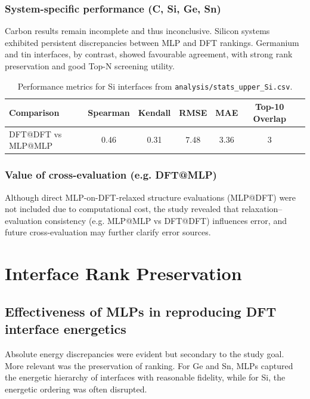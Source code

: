 \subsubsection{System-specific performance (C, Si, Ge, Sn)}

Carbon results remain incomplete and thus inconclusive. Silicon systems exhibited persistent discrepancies between MLP
and DFT rankings. Germanium and tin interfaces, by contrast, showed favourable agreement, with strong rank preservation
and good Top-N screening utility.

\begin{table}[h]
    \centering
    \caption{Performance metrics for Si interfaces from \texttt{analysis/stats_upper_Si.csv}.}
    \begin{tabular}{lcccccc}
        Comparison & Spearman & Kendall & RMSE & MAE & Top-10 Overlap \\
        \hline
        DFT@DFT vs MLP@MLP & 0.46 & 0.31 & 7.48 & 3.36 & 3 \\
    \end{tabular}
\end{table}

\subsubsection{Value of cross-evaluation (e.g. DFT@MLP)}

Although direct MLP-on-DFT-relaxed structure evaluations (MLP@DFT) were not included due to computational cost, the
study revealed that relaxation--evaluation consistency (e.g. MLP@MLP vs DFT@DFT) influences error, and future
cross-evaluation may further clarify error sources.


\section{Interface Rank Preservation}
\label{section:interface_rank_preservation}

\subsection{Effectiveness of MLPs in reproducing DFT interface energetics}

Absolute energy discrepancies were evident but secondary to the study goal. More relevant was the preservation of
ranking. For Ge and Sn, MLPs captured the energetic hierarchy of interfaces with reasonable fidelity, while for Si, the
energetic ordering was often disrupted.

